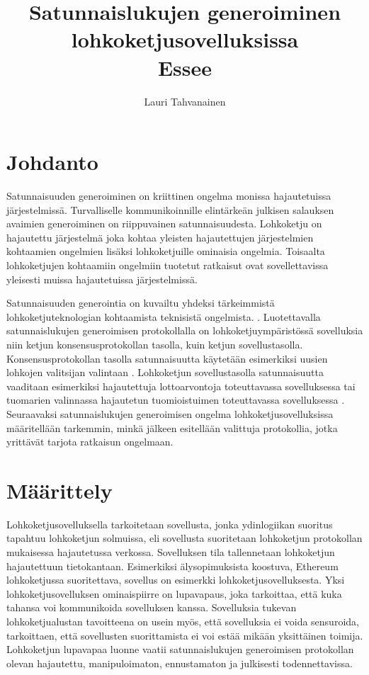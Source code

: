 \documentclass{article}
\title{ Satunnaislukujen generoiminen lohkoketjusovelluksissa \\\small{Essee}}
\author{Lauri Tahvanainen}
\begin{document}
\maketitle

\section{Johdanto}

Satunnaisuuden generoiminen on kriittinen ongelma monissa hajautetuissa järjestelmissä. Turvalliselle kommunikoinnille elintärkeän julkisen salauksen avaimien generoiminen on riippuvainen satunnaisuudesta\cite{corrigan-gibbs_ensuring_2014}. Lohkoketju on hajautettu järjestelmä joka kohtaa yleisten hajautettujen järjestelmien kohtaamien ongelmien lisäksi lohkoketjuille ominaisia ongelmia. Toisaalta lohkoketjujen kohtaamiin ongelmiin tuotetut ratkaisut ovat sovellettavissa yleisesti muissa hajautetuissa järjestelmissä. 

Satunnaisuuden generointia on kuvailtu yhdeksi tärkeimmistä lohkoketjuteknologian kohtaamista teknisistä ongelmista. \cite{noauthor_hard_nodate}.  Luotettavalla satunnaislukujen generoimisen protokollalla on lohkoketjuympäristössä sovelluksia niin ketjun konsensusprotokollan tasolla, kuin ketjun sovellustasolla. Konsensusprotokollan tasolla satunnaisuutta käytetään esimerkiksi uusien lohkojen valitsijan valintaan \cite{chen_algorand_2017}. Lohkoketjun sovellustasolla satunnaisuutta vaaditaan esimerkiksi hajautettuja lottoarvontoja toteuttavassa sovelluksessa \cite{pooltogether_pooltogether_nodate} tai tuomarien valinnassa hajautetun tuomioistuimen toteuttavassa sovelluksessa \cite{lesaege_kleros_2020}. Seuraavaksi satunnaislukujen generoimisen ongelma lohkoketjusovelluksissa määritellään tarkemmin, minkä jälkeen esitellään valittuja protokollia, jotka yrittävät tarjota ratkaisun ongelmaan.

\section{Määrittely}

Lohkoketjusovelluksella tarkoitetaan sovellusta, jonka ydinlogiikan suoritus tapahtuu lohkoketjun solmuissa, eli sovellusta suoritetaan lohkoketjun protokollan mukaisessa hajautetussa verkossa. Sovelluksen tila tallennetaan lohkoketjun hajautettuun tietokantaan. Esimerkiksi älysopimuksista koostuva, Ethereum\cite{ethereum_foundation_ethereum_nodate}
 lohkoketjussa suoritettava, sovellus on esimerkki lohkoketjusovelluksesta. Yksi lohkoketjusovelluksen ominaispiirre on lupavapaus, joka tarkoittaa, että kuka tahansa voi kommunikoida sovelluksen kanssa. Sovelluksia tukevan lohkoketjualustan tavoitteena on usein myös, että sovelluksia ei voida sensuroida, tarkoittaen, että sovellusten suorittamista ei voi estää mikään yksittäinen toimija.
Lohkoketjun lupavapaa luonne vaatii satunnaislukujen generoimisen protokollan olevan hajautettu, manipuloimaton, ennustamaton ja julkisesti todennettavissa.
\end{document}
